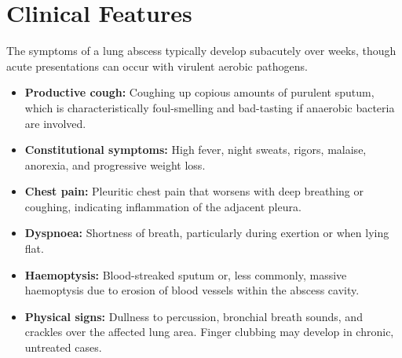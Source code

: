 \section*{Clinical Features}
The symptoms of a lung abscess typically develop subacutely over weeks, though acute presentations can occur with virulent aerobic pathogens.
\begin{itemize}
    \item \textbf{Productive cough:} Coughing up copious amounts of purulent sputum, which is characteristically foul-smelling and bad-tasting if anaerobic bacteria are involved.
    \item \textbf{Constitutional symptoms:} High fever, night sweats, rigors, malaise, anorexia, and progressive weight loss.
    \item \textbf{Chest pain:} Pleuritic chest pain that worsens with deep breathing or coughing, indicating inflammation of the adjacent pleura.
    \item \textbf{Dyspnoea:} Shortness of breath, particularly during exertion or when lying flat.
    \item \textbf{Haemoptysis:} Blood-streaked sputum or, less commonly, massive haemoptysis due to erosion of blood vessels within the abscess cavity.
    \item \textbf{Physical signs:} Dullness to percussion, bronchial breath sounds, and crackles over the affected lung area. Finger clubbing may develop in chronic, untreated cases.
\end{itemize}

